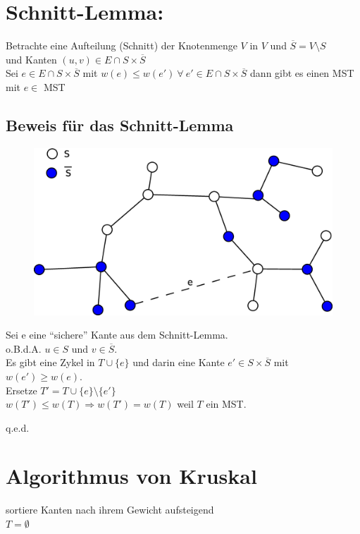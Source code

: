\section{Schnitt-Lemma:}
Betrachte eine Aufteilung (Schnitt) der Knotenmenge $V$ in $V$ und $\overline{S} = V\setminus S$ \\und Kanten $(u,v) \in E \cap S\times \overline{S}$\\
Sei $e \in E \cap S \times \overline{S}$ mit $w(e) \leq w(e') ~\forall ~e' \in E \cap S\times \overline{S}$ dann gibt es einen MST mit $e \in$ MST
\subsection{Beweis für das Schnitt-Lemma}
\begin{figure}[h]
\centering
\includegraphics[width=0.5\linewidth]{19/Grafik/SpannbaumBeweis}
\caption{}
\label{fig:SpannbaumBeweis}
\end{figure}

Sei e eine "`sichere"' Kante aus dem Schnitt-Lemma.\\
o.B.d.A. $u\in S$ und $v \in \overline{S}$.\\
Es gibt eine Zykel in $T\cup \{e\}$ und darin eine Kante $e'\in S\times \overline{S}$ mit $w(e') \geq w(e)$.\\
Ersetze $T'=T\cup\{e\}\setminus\{ e' \}$\\
$w(T') \leq w(T) \Rightarrow w(T') = w(T)$ weil $T$ ein MST.
\begin{flushright}
	q.e.d.
\end{flushright}
\section{Algorithmus von Kruskal}
sortiere Kanten nach ihrem Gewicht aufsteigend\\
$T=\emptyset$\\

